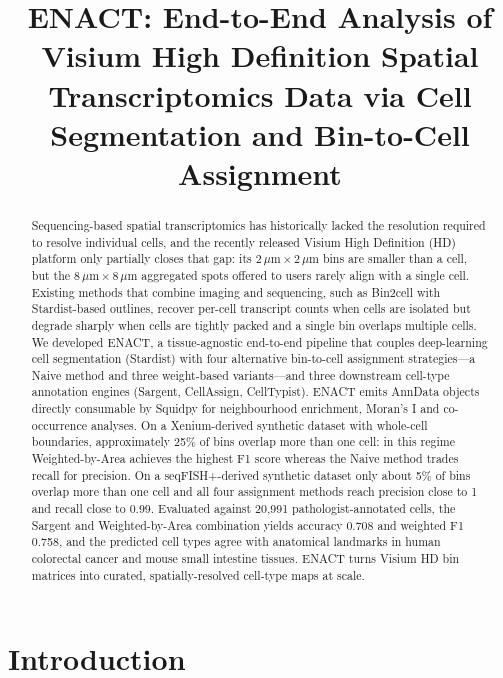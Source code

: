 \documentclass[11pt]{article}
\title{ENACT: End-to-End Analysis of Visium High Definition Spatial Transcriptomics Data via Cell Segmentation and Bin-to-Cell Assignment}
\author{}
\date{}
\begin{document}
\maketitle

\begin{abstract}
Sequencing-based spatial transcriptomics has historically lacked the resolution required to resolve individual cells, and the recently released Visium High Definition (HD) platform only partially closes that gap: its $2\,\mu\mathrm{m}\times 2\,\mu\mathrm{m}$ bins are smaller than a cell, but the $8\,\mu\mathrm{m}\times 8\,\mu\mathrm{m}$ aggregated spots offered to users rarely align with a single cell. Existing methods that combine imaging and sequencing, such as Bin2cell with Stardist-based outlines, recover per-cell transcript counts when cells are isolated but degrade sharply when cells are tightly packed and a single bin overlaps multiple cells. We developed ENACT, a tissue-agnostic end-to-end pipeline that couples deep-learning cell segmentation (Stardist) with four alternative bin-to-cell assignment strategies---a Naive method and three weight-based variants---and three downstream cell-type annotation engines (Sargent, CellAssign, CellTypist). ENACT emits AnnData objects directly consumable by Squidpy for neighbourhood enrichment, Moran's I and co-occurrence analyses. On a Xenium-derived synthetic dataset with whole-cell boundaries, approximately 25\% of bins overlap more than one cell: in this regime Weighted-by-Area achieves the highest F1 score whereas the Naive method trades recall for precision. On a seqFISH+-derived synthetic dataset only about 5\% of bins overlap more than one cell and all four assignment methods reach precision close to 1 and recall close to 0.99. Evaluated against 20{,}991 pathologist-annotated cells, the Sargent and Weighted-by-Area combination yields accuracy 0.708 and weighted F1 0.758, and the predicted cell types agree with anatomical landmarks in human colorectal cancer and mouse small intestine tissues. ENACT turns Visium HD bin matrices into curated, spatially-resolved cell-type maps at scale.
\end{abstract}

\section{Introduction}
\end{document}
